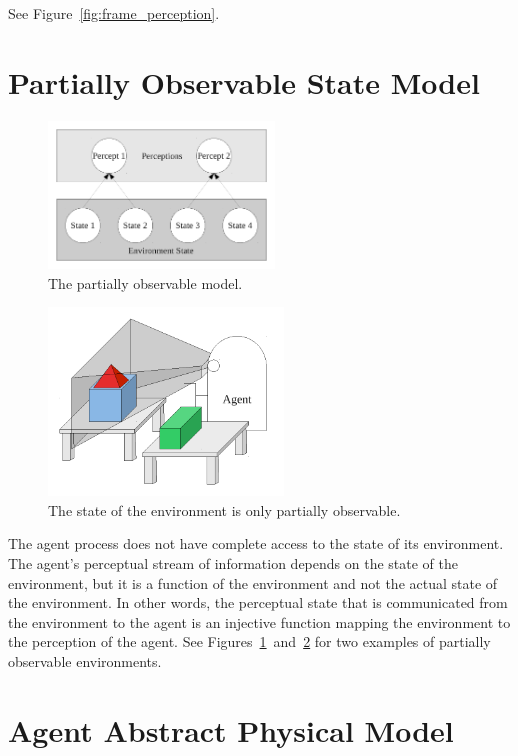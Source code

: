 See Figure~\ref{fig:frame_perception}.


\section{Partially Observable State Model}

\begin{figure}[bth]
  \center
  \includegraphics[width=6cm]{gfx/partially_observable}
  \caption[The partially observable state model]{The partially observable model.}
  \label{fig:partially_observable}
\end{figure}

\begin{figure}[bth]
  \center
  \includegraphics[height=5cm]{gfx/partial_frame_perception}
  \caption[The state of the environment is only partially
    observable]{The state of the environment is only partially
    observable.}
  \label{fig:partial_frame_perception}
\end{figure}

The agent process does not have complete access to the state of its
environment.  The agent's perceptual stream of information depends on
the state of the environment, but it is a function of the environment
and not the actual state of the environment.  In other words, the
perceptual state that is communicated from the environment to the
agent is an injective function mapping the environment to the
perception of the agent.  See
Figures~\ref{fig:partially_observable}~and~\ref{fig:partial_frame_perception}
for two examples of partially observable environments.


\section{Agent Abstract Physical Model}

